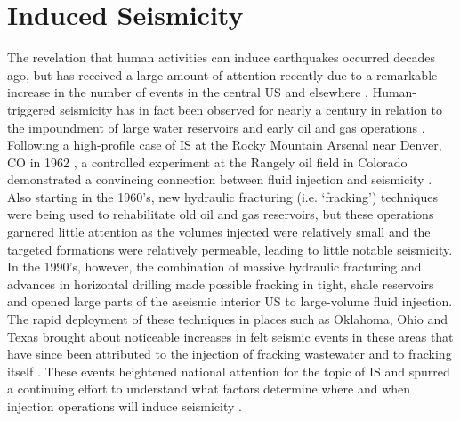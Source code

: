 \section{Induced Seismicity}\label{IS}
The revelation that human activities can induce earthquakes occurred decades ago, but has received a large amount of attention recently due to a remarkable increase in the number of events in the central US and elsewhere \citep{Ellsworth_2013,Kim_2013,Keranen_2013,Kim_2013,Keranen_2013,Zoback_2012co2,Baisch_2006,Evans_2004,Deichmann_2009}. Human-triggered seismicity has in fact been observed for nearly a century in relation to the impoundment of large water reservoirs \citep[e.g.][]{carder1945seismic,Gupta_2018} and early oil and gas operations \citep{Hough_2016}. Following a high-profile case of IS at the Rocky Mountain Arsenal near Denver, CO in 1962 \citep{Healy_1968}, a controlled experiment at the Rangely oil field in Colorado demonstrated a convincing connection between fluid injection and seismicity \citep{Raleigh_1976}. Also starting in the 1960's, new hydraulic fracturing (i.e. `fracking') techniques were being used to rehabilitate old oil and gas reservoirs, but these operations garnered little attention as the volumes injected were relatively small and the targeted formations were relatively permeable, leading to little notable seismicity. In the 1990's, however, the combination of massive hydraulic fracturing and advances in horizontal drilling made possible fracking in tight, shale reservoirs and opened large parts of the aseismic interior US to large-volume fluid injection. The rapid deployment of these techniques in places such as Oklahoma, Ohio and Texas brought about noticeable increases in felt seismic events in these areas \citep{Ellsworth_2013} that have since been attributed to the injection of fracking wastewater and to fracking itself \citep[e.g.][]{Kim_2013,Keranen_2013,Kim_2013,Keranen_2013}.  These events heightened national attention for the topic of IS and spurred a continuing effort to understand what factors determine where and when injection operations will induce seismicity \citep[e.g.][]{Goebel_2018}.

